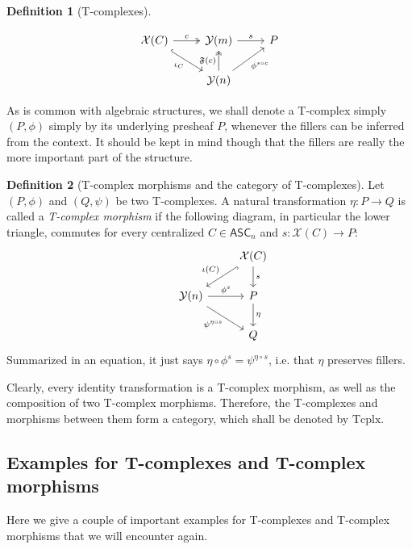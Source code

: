 \documentclass{article}
\theoremstyle{remark}
\theoremstyle{definition}
\newtheorem{definition}{Definition}[subsection]
\newcommand{\ASC}{\mathsf{ASC}}
\newcommand{\Y}{\mathcal Y}
\newcommand{\X}{\mathcal X}
\newcommand{\F}{\mathfrak F}
\newcommand{\Tcplx}{\mathrm{Tcplx}}
\begin{document}
\begin{definition}[T-complexes]
\begin{enumerate}
			\begin{equation}\label{epifac}\begin{tikzcd}
				\X(C)\arrow[two heads]{r}{c}\arrow[hook]{dr}[swap]{\iota_C}&\Y(m)\arrow{r}{s}&P\\
				&\Y(n)\arrow[two heads]{u}{\F(c)}\arrow{ur}[swap]{\phi^{s\circ c}}
			\end{tikzcd}\end{equation}
		\end{enumerate}
		As is common with algebraic structures, we shall denote a T-complex simply $(P,\phi)$ simply by its underlying presheaf $P$, whenever the fillers can be inferred from the context. It should be kept in mind though that the fillers are really the more important part of the structure.
	\end{definition}
	\begin{definition}[T-complex morphisms and the category of T-complexes]
		Let $(P,\phi)$ and $(Q,\psi)$ be two T-complexes. A natural transformation $\eta:P\to Q$ is called a \textit{T-complex morphism} if the following diagram, in particular the lower triangle, commutes for every centralized $C\in\ASC_n$ and $s:\X(C)\to P$:
		\[\begin{tikzcd}
			&&\X(C)\arrow{d}{s}\arrow[hook]{ld}[swap]{\iota(C)}\\
			&\Y(n)\arrow{r}{\phi^s}\arrow{dr}[swap]{\psi^{\eta\circ s}}&P\arrow{d}{\eta}\\
			&&Q
		\end{tikzcd}\]
		Summarized in an equation, it just says $\eta\circ\phi^s=\psi^{\eta\circ s}$, i.e. that $\eta$ preserves fillers.
		
		Clearly, every identity transformation is a T-complex morphism, as well as the composition of two T-complex morphisms. Therefore, the T-complexes and morphisms between them form a category, which shall be denoted by $\Tcplx$.
	\end{definition}
	\subsection{Examples for T-complexes and T-complex morphisms}
	Here we give a couple of important examples for T-complexes and T-complex morphisms that we will encounter again.
	
\end{document}
